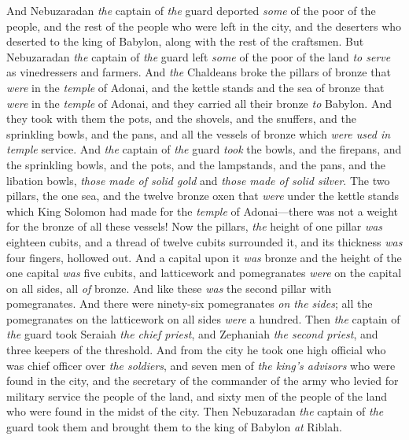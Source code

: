 \begin{biblechapter}
\verse And Nebuzaradan \textit{the} captain of \textit{the} guard deported \textit{some} of the poor of the people, and the rest of the people who were left in the city, and the deserters who deserted to the king of Babylon, along with the rest of the craftsmen.
\verse But Nebuzaradan \textit{the} captain of \textit{the} guard left \textit{some} of the poor of the land \textit{to serve} as vinedressers and farmers.
\verse And \textit{the} Chaldeans broke the pillars of bronze that \textit{were} in the \textit{temple} of Adonai, and the kettle stands and the sea of bronze that \textit{were} in the \textit{temple} of Adonai, and they carried all their bronze \textit{to} Babylon.
\verse And they took with them the pots, and the shovels, and the snuffers, and the sprinkling bowls, and the pans, and all the vessels of bronze which \textit{were used in temple} service.
\verse And \textit{the} captain of \textit{the} guard \textit{took} the bowls, and the firepans, and the sprinkling bowls, and the pots, and the lampstands, and the pans, and the libation bowls, \textit{those made of solid gold} and \textit{those made of solid silver}.
\verse The two pillars, the one sea, and the twelve bronze oxen that \textit{were} under the kettle stands which King Solomon had made for the \textit{temple} of Adonai—there was not a weight for the bronze of all these vessels!
\verse Now the pillars, \textit{the} height of one pillar \textit{was} eighteen cubits, and a thread of twelve cubits surrounded it, and its thickness \textit{was} four fingers, hollowed out.
\verse And a capital upon it \textit{was} bronze and the height of the one capital \textit{was} five cubits, and latticework and pomegranates \textit{were} on the capital on all sides, all \textit{of} bronze. And like these \textit{was} the second pillar with pomegranates.
\verse And there were ninety-six pomegranates \textit{on the sides}; all the pomegranates on the latticework on all sides \textit{were} a hundred.
\verse Then \textit{the} captain of \textit{the} guard took Seraiah \textit{the chief priest}, and Zephaniah \textit{the second priest}, and three keepers of the threshold.
\verse And from the city he took one high official who was chief officer over \textit{the soldiers}, and seven men of \textit{the king’s advisors} who were found in the city, and the secretary of the commander of the army who levied for military service the people of the land, and sixty men of the people of the land who were found in the midst of the city.
\verse Then Nebuzaradan \textit{the} captain of \textit{the} guard took them and brought them to the king of Babylon \textit{at} Riblah.

\end{biblechapter}
